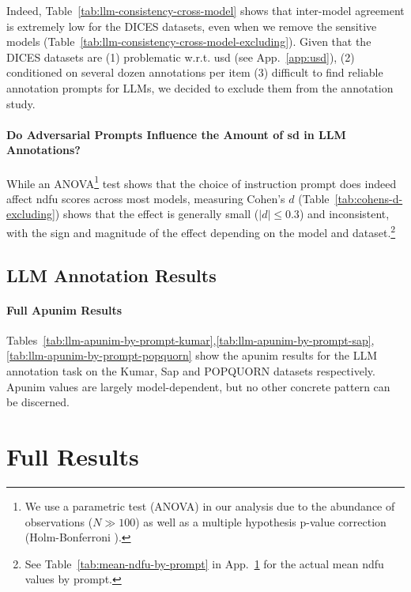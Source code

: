 \documentclass[manuscript,screen,review,anonymous]{acmart}
\theoremstyle{acmplain}
\theoremstyle{researchquestionstyle}
\begin{document}
Indeed, Table~\ref{tab:llm-consistency-cross-model} shows that inter-model agreement is extremely low for the DICES datasets, even when we remove the sensitive models (Table~\ref{tab:llm-consistency-cross-model-excluding}). Given that the DICES datasets are (1) problematic w.r.t. \ac{usd} (see App.~\ref{app:usd}), (2) conditioned on several dozen annotations per item (3) difficult to find reliable annotation prompts for LLMs, we decided to exclude them from the annotation study.

\paragraph{Do Adversarial Prompts Influence the Amount of \ac{sd} in LLM Annotations?} While an ANOVA\footnote{We use a parametric test (ANOVA) in our analysis due to the abundance of observations ($N \gg 100$) as well as a multiple hypothesis p-value correction (Holm-Bonferroni \citep{holms}).} test shows that the choice of instruction prompt does indeed affect \ac{ndfu} scores across most models, measuring Cohen's $d$ (Table~\ref{tab:cohens-d-excluding}) shows that the effect is generally small ($\lvert d \rvert \leq 0.3$) and inconsistent, with the sign and magnitude of the effect depending on the model and dataset.\footnote{See Table~\ref{tab:mean-ndfu-by-prompt} in App.~\ref{app:full} for the actual mean \ac{ndfu} values by prompt.}


\subsection{LLM Annotation Results}

\begingroup
	\scriptsize
	
	
	
\endgroup

\paragraph{Full Apunim Results}
Tables~\ref{tab:llm-apunim-by-prompt-kumar},\ref{tab:llm-apunim-by-prompt-sap},\ref{tab:llm-apunim-by-prompt-popquorn} show the apunim results for the LLM annotation task on the Kumar, Sap and POPQUORN datasets respectively. Apunim values are largely model-dependent, but no other concrete pattern can be discerned. 


\section{Full Results}
\label{app:full}
\end{document}
